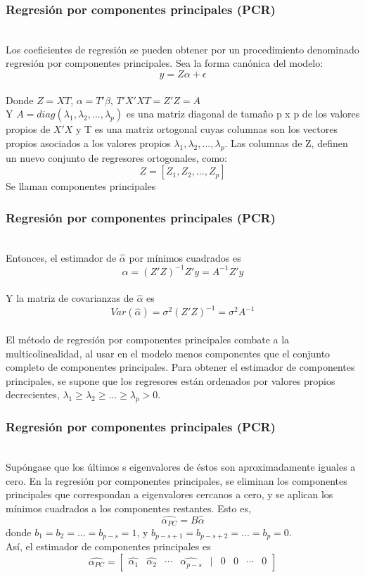 \documentclass[12pt]{beamer}
\begin{document}
\begin{frame}
\frametitle{Regresión por componentes principales (PCR)}
~\\Los coeficientes de regresión se pueden obtener por un procedimiento denominado regresión por componentes principales. Sea la forma canónica del modelo:
$$y=Z\alpha+\epsilon$$
~\\Donde $Z=XT$, $\alpha=T'\beta$,  $T'X'XT=Z'Z=A$ 
~\\Y $A=diag(\lambda_{1},\lambda_{2},...,\lambda_{p})$ es una matriz diagonal de tamaño p x p de los valores propios de $X'X$ y T es una matriz ortogonal cuyas columnas son los vectores propios asociados a los valores propios $\lambda_{1},\lambda_{2},...,\lambda_{p}$. Las columnas de Z, definen un nuevo conjunto de regresores ortogonales, como:
$$Z=[Z_{1},Z_{2},...,Z_{p}]$$ Se llaman componentes principales
\end{frame}

\begin{frame}
\frametitle{Regresión por componentes principales (PCR)}
~\\Entonces, el estimador de $\hat{\alpha}$ por mínimos cuadrados es
$$\hat{\alpha}=(Z'Z)^{-1}Z'y= A^{-1}Z'y$$
~\\Y la matriz de covarianzas de $\hat{\alpha}$ es 
$$Var(\hat{\alpha})=\sigma^2 (Z'Z)^{-1}=\sigma^2 A^{-1}$$
~\\El método de regresión por componentes principales combate a la multicolinealidad,
al usar en el modelo menos componentes que el conjunto completo de componentes principales. Para obtener el estimador de componentes principales, se supone que los regresores están ordenados por valores propios decrecientes, $\lambda_{1}\geq\lambda_{2}\geq...\geq\lambda_{p}>0$.
\end{frame}

\begin{frame}
\frametitle{Regresión por componentes principales (PCR)}
~\\Supóngase que los últimos s eigenvalores de éstos son aproximadamente iguales a cero. En la regresión por componentes principales, se eliminan los componentes principales que correspondan a eigenvalores cercanos a cero, y se aplican los mínimos cuadrados a los componentes restantes. Esto es,
$$\hat{\alpha_{PC}}=B\hat{\alpha}$$
donde $b_{1}=b_{2}=...=b_{p-s}=1$, y $b_{p-s+1}=b_{p-s+2}=...=b_{p}=0$.
~\\Así, el estimador de componentes principales es
$$\hat{\alpha_{PC}}=\left[\begin{matrix}
\hat{\alpha_{1}} & \hat{\alpha_{2}} & \cdots & \hat{\alpha_{p-s}} & | & 0 & 0 & \cdots & 0
\end{matrix}\right]$$ 
\end{frame}
\end{document}
